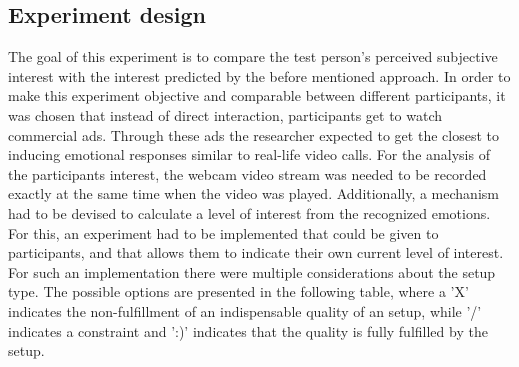 \subsection{Experiment design}
The goal of this experiment is to compare the test person's perceived subjective interest with the interest predicted by the before mentioned approach. In order to make this experiment objective and comparable between different participants, it was chosen that instead of direct interaction, participants get to watch commercial ads. Through these ads the researcher expected to get the closest to inducing emotional responses similar to real-life video calls.
\newline\newline
For the analysis of the participants interest, the webcam video stream was needed to be recorded exactly at the same time when the video was played. Additionally, a mechanism had to be devised to calculate a level of interest from the recognized emotions. For this, an experiment had to be implemented that could be given to participants, and that allows them to indicate their own current level of interest.
\newline\newline
For such an implementation there were multiple considerations about the setup type. The possible options are presented in the following table, where a 'X' indicates the non-fulfillment of an indispensable quality of an setup, while '/' indicates a constraint and ':)' indicates that the quality is fully fulfilled by the setup.

